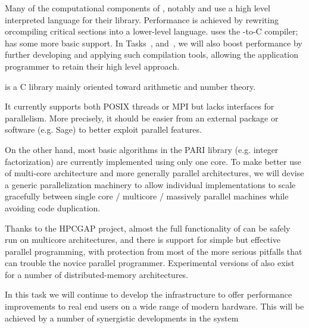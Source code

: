 \begin{workpackage}
\begin{wpdescription}
  
  Many of the computational components of \TheProject, notably \Sage
  and \GAP use a high level
  interpreted language for their library. Performance is achieved by
  rewriting orcompiling critical sections into a lower-level
  language. \Sage uses
  the \Cython \Python-to-C compiler; \GAP has some more basic support.
  In Tasks~, 
  and~, we will also boost performance by
  further developing and applying such compilation tools, allowing the
  application programmer to retain their high level approach.

\end{wpdescription}
\begin{tasklist}
\begin{task}[title=PARI,id=hpc-pari]
  \Pari is a C library mainly oriented toward arithmetic and number theory.
  
  It currently supports both POSIX threads or MPI but lacks interfaces for
  parallelism. More precisely, it should be easier from an external package
  or software (e.g. Sage) to better exploit \Pari parallel features.

  On the other hand, most basic algorithms in the PARI library (e.g. integer
  factorization) are currently implemented using only one core. To
  make better use of multi-core architecture and more generally parallel
  architectures, we will devise a generic parallelization machinery
  to allow individual implementations to scale gracefully between single
  core / multicore / massively parallel machines while avoiding code
  duplication.
\end{task}


\begin{task}[title=GAP,id=hpc-gap]
  Thanks to the HPCGAP project, almost the full functionality of \GAP
  can be safely run on multicore architectures, and there is support for
  simple but effective parallel programming, with protection from most
  of the more serious pitfalls that can trouble the novice parallel
  programmer. Experimental versions of \GAP also exist for a number of
  distributed-memory architectures.


In this task we will continue to develop the \GAP infrastructure to
offer performance improvements to real end users on a wide range of
modern hardware. This will be achieved by a number of synergistic
developments in the system


\end{task}
\end{tasklist}
\end{workpackage}
